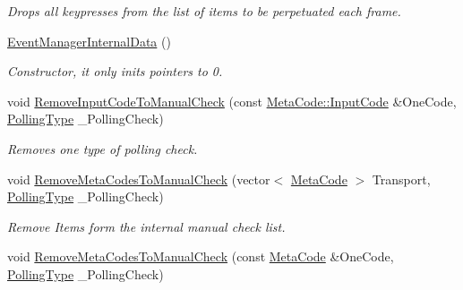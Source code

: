 \begin{DoxyCompactItemize}
\begin{DoxyCompactList}\small\item\em Drops all keypresses from the list of items to be perpetuated each frame. \item\end{DoxyCompactList}\item 
\hypertarget{structMezzanine_1_1internal_1_1EventManagerInternalData_a8ac76b5f7da9f44b5bb962ab9df125ad}{
\hyperlink{structMezzanine_1_1internal_1_1EventManagerInternalData_a8ac76b5f7da9f44b5bb962ab9df125ad}{EventManagerInternalData} ()}
\label{structMezzanine_1_1internal_1_1EventManagerInternalData_a8ac76b5f7da9f44b5bb962ab9df125ad}

\begin{DoxyCompactList}\small\item\em Constructor, it only inits pointers to 0. \item\end{DoxyCompactList}\item 
void \hyperlink{structMezzanine_1_1internal_1_1EventManagerInternalData_a2efd493359f7abd3eef0ba90de5c4897}{RemoveInputCodeToManualCheck} (const \hyperlink{classMezzanine_1_1MetaCode_a3b5633f0145bf3287cf53a3f05b5563c}{MetaCode::InputCode} \&OneCode, \hyperlink{structMezzanine_1_1internal_1_1EventManagerInternalData_a4179a167c7f67babd5aa4902dc279027}{PollingType} \_\-PollingCheck)
\begin{DoxyCompactList}\small\item\em Removes one type of polling check. \item\end{DoxyCompactList}\item 
void \hyperlink{structMezzanine_1_1internal_1_1EventManagerInternalData_a9c1d7a9cd1a896dc37e2d4971ea8dc97}{RemoveMetaCodesToManualCheck} (vector$<$ \hyperlink{classMezzanine_1_1MetaCode}{MetaCode} $>$ Transport, \hyperlink{structMezzanine_1_1internal_1_1EventManagerInternalData_a4179a167c7f67babd5aa4902dc279027}{PollingType} \_\-PollingCheck)
\begin{DoxyCompactList}\small\item\em Remove Items form the internal manual check list. \item\end{DoxyCompactList}\item 
void \hyperlink{structMezzanine_1_1internal_1_1EventManagerInternalData_ae80f07727a2a0d335bd03bf0e07dd1e4}{RemoveMetaCodesToManualCheck} (const \hyperlink{classMezzanine_1_1MetaCode}{MetaCode} \&OneCode, \hyperlink{structMezzanine_1_1internal_1_1EventManagerInternalData_a4179a167c7f67babd5aa4902dc279027}{PollingType} \_\-PollingCheck)

\end{DoxyCompactItemize}
